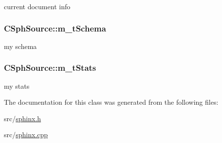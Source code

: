 current document info 

\hypertarget{classCSphSource_a3f565a200e543bd96724d53f9756b510}{
\subsubsection[{m\-\_\-t\-Schema}]{ C\-Sph\-Source\-::m\-\_\-t\-Schema\hspace{0.3cm}{\ttfamily [protected]}}}\label{classCSphSource_a3f565a200e543bd96724d53f9756b510}


my schema 

\hypertarget{classCSphSource_aab2f058ba7edd25fccb64d3352cdc513}{
\subsubsection[{m\-\_\-t\-Stats}]{ C\-Sph\-Source\-::m\-\_\-t\-Stats\hspace{0.3cm}{\ttfamily [protected]}}}\label{classCSphSource_aab2f058ba7edd25fccb64d3352cdc513}


my stats 



The documentation for this class was generated from the following files\-:\begin{DoxyCompactItemize}
\item 
src/\hyperlink{sphinx_8h}{sphinx.\-h}\item 
src/\hyperlink{sphinx_8cpp}{sphinx.\-cpp}\end{DoxyCompactItemize}

